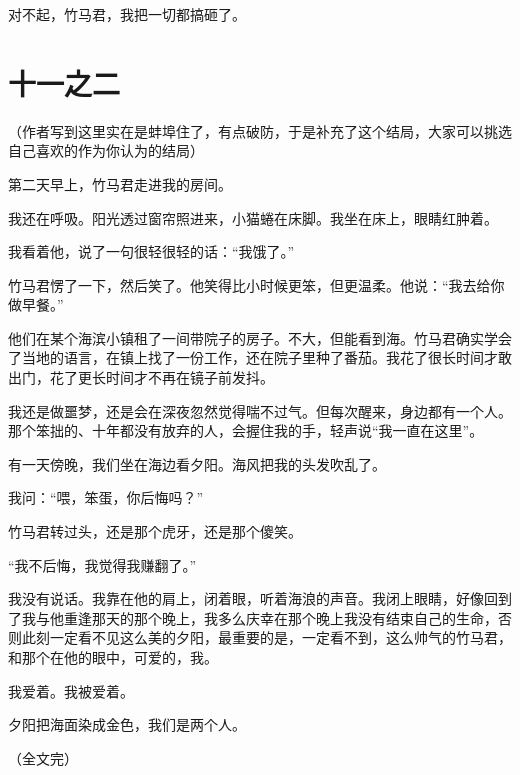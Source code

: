 \documentclass[12pt, a4paper]{ctexart}
\begin{document}
对不起，竹马君，我把一切都搞砸了。

\section*{十一之二}

（作者写到这里实在是蚌埠住了，有点破防，于是补充了这个结局，大家可以挑选自己喜欢的作为你认为的结局）

第二天早上，竹马君走进我的房间。

我还在呼吸。阳光透过窗帘照进来，小猫蜷在床脚。我坐在床上，眼睛红肿着。

我看着他，说了一句很轻很轻的话：“我饿了。”

竹马君愣了一下，然后笑了。他笑得比小时候更笨，但更温柔。他说：“我去给你做早餐。”

他们在某个海滨小镇租了一间带院子的房子。不大，但能看到海。竹马君确实学会了当地的语言，在镇上找了一份工作，还在院子里种了番茄。我花了很长时间才敢出门，花了更长时间才不再在镜子前发抖。

我还是做噩梦，还是会在深夜忽然觉得喘不过气。但每次醒来，身边都有一个人。那个笨拙的、十年都没有放弃的人，会握住我的手，轻声说“我一直在这里”。

有一天傍晚，我们坐在海边看夕阳。海风把我的头发吹乱了。

我问：“喂，笨蛋，你后悔吗？”

竹马君转过头，还是那个虎牙，还是那个傻笑。

“我不后悔，我觉得我赚翻了。”

我没有说话。我靠在他的肩上，闭着眼，听着海浪的声音。我闭上眼睛，好像回到了我与他重逢那天的那个晚上，我多么庆幸在那个晚上我没有结束自己的生命，否则此刻一定看不见这么美的夕阳，最重要的是，一定看不到，这么帅气的竹马君，和那个在他的眼中，可爱的，我。

我爱着。我被爱着。

夕阳把海面染成金色，我们是两个人。

\begin{center}
（全文完）
\end{center}
\end{document}
